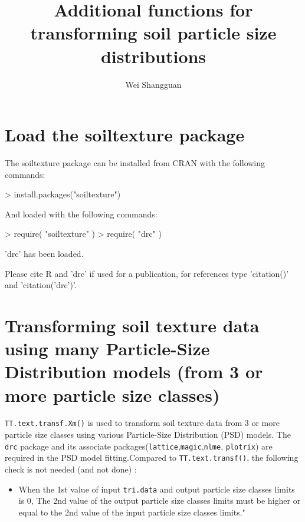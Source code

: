 \documentclass[a4paper]{article}
\title{Additional functions for transforming soil particle%
    size distributions}
\author{Wei Shangguan}
\begin{document}
\maketitle



\section{Load the soiltexture package}


The soiltexture package can be installed from CRAN with the following 
commands: 

\begin{Schunk}
\begin{Sinput}
> install.packages("soiltexture") 
\end{Sinput}
\end{Schunk}


And loaded with the following commands:

\begin{Schunk}
\begin{Sinput}
> require( "soiltexture" ) 
> require( "drc" )
\end{Sinput}
\begin{Soutput}
'drc' has been loaded.

Please cite R and 'drc' if used for a publication,
for references type 'citation()' and 'citation('drc')'.
\end{Soutput}
\end{Schunk}



\section{Transforming soil texture data using many Particle-Size
Distribution models (from 3 or more particle size classes)}


\texttt{TT.text.\-transf.Xm()} is used to transform soil texture
data from 3 or more particle size classes using various
Particle-Size Distribution (PSD) models. The \texttt{drc} package
and its associate
packages(\texttt{lattice},\texttt{magic},\texttt{nlme},
\texttt{plotrix}) are required in the PSD model fitting.Compared to
\texttt{TT.text.\-transf()}, the following check is not needed (and
not done) :

\begin{itemize}
    \item When the 1st value of input \texttt{tri.data} and output
    particle size classes limits is 0, The 2nd value of the output
    particle size classes limits must be higher or equal to the
    2nd value of the input particle size classes limits."
\end{itemize}
\end{document}

